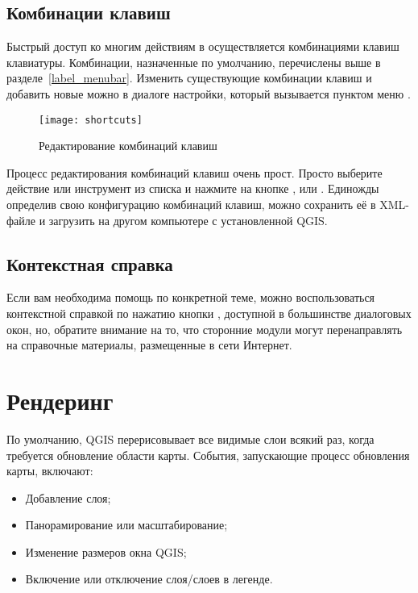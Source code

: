\subsection{Комбинации клавиш}\label{shortcuts}

Быстрый доступ ко многим действиям в \qg осуществляется комбинациями клавиш
клавиатуры. Комбинации, назначенные по умолчанию, перечислены выше в разделе~\ref{label_menubar}.
Изменить существующие комбинации клавиш и добавить новые можно в диалоге настройки,
который вызывается пунктом меню  \arrow
{}.

\begin{figure}[ht]
   \centering
   \texttt{[image: shortcuts]}
   \caption{Редактирование комбинаций клавиш \wincaption} \label{fig:shortcuts}
\end{figure}

Процесс редактирования комбинаций клавиш очень прост. Просто выберите
действие или инструмент из списка и нажмите на кнопке ,
 или . Единожды определив свою
конфигурацию комбинаций клавиш, можно сохранить её в XML-файле и загрузить
на другом компьютере с установленной QGIS.

\subsection{Контекстная справка}\label{context_help}

Если вам необходима помощь по конкретной теме, можно воспользоваться
контекстной справкой по нажатию кнопки , доступной в
большинстве диалоговых окон, но, обратите внимание на то, что сторонние
модули могут перенаправлять на справочные материалы, размещенные в сети
Интернет.

\section{Рендеринг}\label{subsec:redraw_events}

По умолчанию, QGIS перерисовывает все видимые слои всякий раз, когда
требуется обновление области карты. События, запускающие
процесс обновления карты, включают:

\begin{itemize}
\item Добавление слоя;
\item Панорамирование или масштабирование;
\item Изменение размеров окна QGIS;
\item Включение или отключение слоя/слоев в легенде.
\end{itemize}


